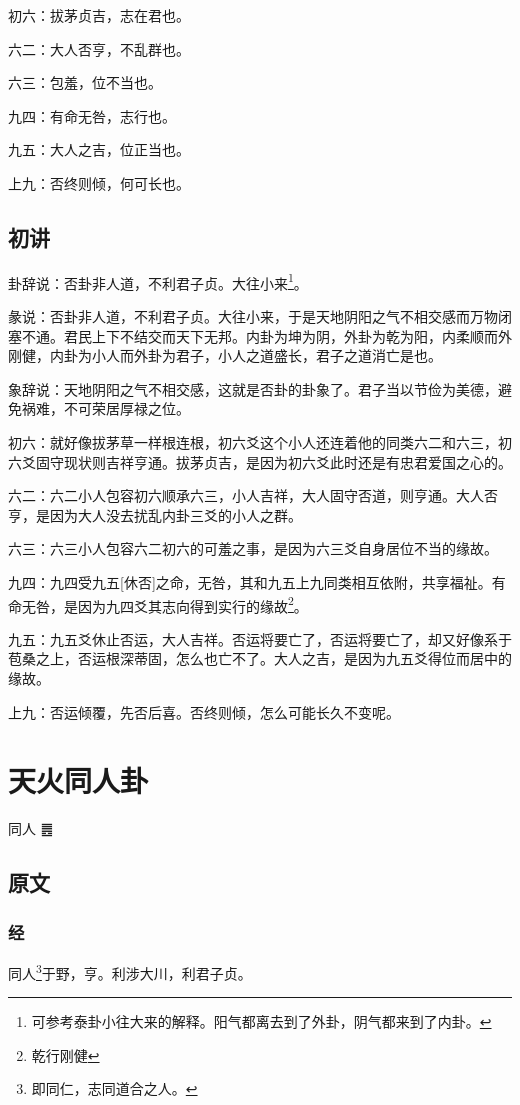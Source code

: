 \documentclass[12pt,oneside]{book}
\begin{document}
初六：拔茅贞吉，志在君也。

六二：大人否亨，不乱群也。

六三：包羞，位不当也。

九四：有命无咎，志行也。

九五：大人之吉，位正当也。

上九：否终则倾，何可长也。


\section{初讲}
卦辞说：否卦非人道，不利君子贞。大往小来\footnote{可参考泰卦小往大来的解释。阳气都离去到了外卦，阴气都来到了内卦。}。

彖说：否卦非人道，不利君子贞。大往小来，于是天地阴阳之气不相交感而万物闭塞不通。君民上下不结交而天下无邦。内卦为坤为阴，外卦为乾为阳，内柔顺而外刚健，内卦为小人而外卦为君子，小人之道盛长，君子之道消亡是也。

象辞说：天地阴阳之气不相交感，这就是否卦的卦象了。君子当以节俭为美德，避免祸难，不可荣居厚禄之位。

初六：就好像拔茅草一样根连根，初六爻这个小人还连着他的同类六二和六三，初六爻固守现状则吉祥亨通。拔茅贞吉，是因为初六爻此时还是有忠君爱国之心的。

六二：六二小人包容初六顺承六三，小人吉祥，大人固守否道，则亨通。大人否亨，是因为大人没去扰乱内卦三爻的小人之群。

六三：六三小人包容六二初六的可羞之事，是因为六三爻自身居位不当的缘故。

九四：九四受九五[休否]之命，无咎，其和九五上九同类相互依附，共享福祉。有命无咎，是因为九四爻其志向得到实行的缘故\footnote{乾行刚健}。

九五：九五爻休止否运，大人吉祥。否运将要亡了，否运将要亡了，却又好像系于苞桑之上，否运根深蒂固，怎么也亡不了。大人之吉，是因为九五爻得位而居中的缘故。

上九：否运倾覆，先否后喜。否终则倾，怎么可能长久不变呢。


\chapter{天火同人卦}
同人 {\Large ䷌}

\section{原文}

\subsection{经}
同人\footnote{即同仁，志同道合之人。}于野，亨。利涉大川，利君子贞。
\end{document}
